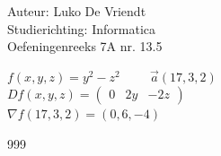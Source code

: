 \documentclass[a4paper]{article}
\begin{document}
\noindent \large Auteur: Luko De Vriendt\\
\noindent \large Studierichting: Informatica\\
\noindent \large Oefeningenreeks 7A nr. 13.5\\

\medskip

\normalsize

$f(x,y,z) = y^2 - z^2 \hspace{1cm} \vec{a} (17,3,2)$ \\

$Df(x,y,z) =
\left(
\begin{array}{ccc}
	0 & 2y & -2z
\end{array}
\right)$\\

$\nabla f(17,3,2) = (0,6,-4)$ \\

\begin{thebibliography}{999}
\end{thebibliography}
\end{document}
